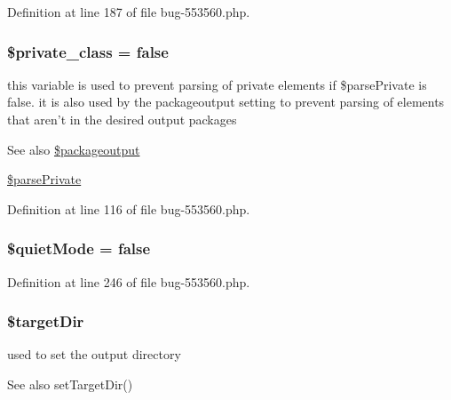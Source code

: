 \-Definition at line 187 of file bug-\/553560.\-php.

\hypertarget{classi_new_render_a91bc6a84d69355cf5bf3fcae3d97df26}{
\subsubsection[{\$private\-\_\-class}]{\setlength{\rightskip}{0pt plus 5cm}\$private\-\_\-class = false}}\label{classi_new_render_a91bc6a84d69355cf5bf3fcae3d97df26}
this variable is used to prevent parsing of private elements if \$parse\-Private is false. it is also used by the packageoutput setting to prevent parsing of elements that aren't in the desired output packages \begin{DoxySeeAlso}{\-See also}
\hyperlink{classi_new_render_ae42e8e1aebbb7e9af6f8b463703e90a0}{\$packageoutput} 

\hyperlink{classi_new_render_a351b7c7ced5d5cd6ce87029cca64d150}{\$parse\-Private} 
\end{DoxySeeAlso}


\-Definition at line 116 of file bug-\/553560.\-php.

\hypertarget{classi_new_render_a7b06630dd83a1912cca52476a5438f9e}{
\subsubsection[{\$quiet\-Mode}]{\setlength{\rightskip}{0pt plus 5cm}\$quiet\-Mode = false}}\label{classi_new_render_a7b06630dd83a1912cca52476a5438f9e}


\-Definition at line 246 of file bug-\/553560.\-php.

\hypertarget{classi_new_render_aae33ae3051c6f350bb69a0631ade81d9}{
\subsubsection[{\$target\-Dir}]{\setlength{\rightskip}{0pt plus 5cm}\$target\-Dir}}\label{classi_new_render_aae33ae3051c6f350bb69a0631ade81d9}
used to set the output directory \begin{DoxySeeAlso}{\-See also}
set\-Target\-Dir() 
\end{DoxySeeAlso}



